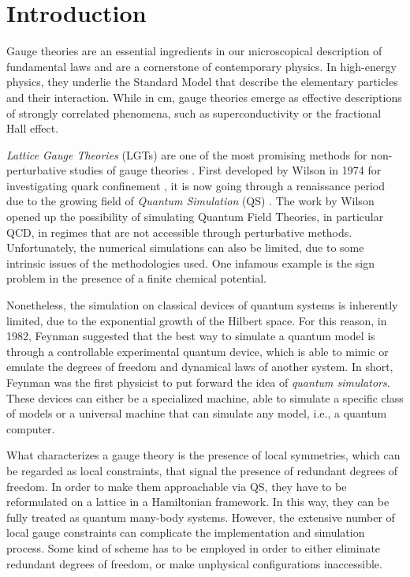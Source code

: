\newpage

\chapter*{Introduction}
\label{chap:introduction}

Gauge theories are an essential ingredients in our microscopical description of fundamental laws and are a cornerstone of contemporary physics.
In high-energy physics, they underlie the Standard Model that describe the elementary particles and their interaction.
While in \ac{cm}, gauge theories emerge as effective descriptions of strongly correlated phenomena, such as superconductivity or the fractional Hall effect.

\emph{Lattice Gauge Theories} (LGTs) are one of the most promising methods for non-perturbative studies of gauge theories \cite{banuls2020simulating}.
First developed by Wilson in 1974 for investigating quark confinement \cite{wilson1974confinement}, it is now going through a renaissance period due to the growing field of \emph{Quantum Simulation} (QS) \cite{cirac2012goals}.
The work by Wilson opened up the possibility of simulating Quantum Field Theories, in particular QCD, in regimes that are not accessible through perturbative methods.
Unfortunately, the numerical simulations can also be limited, due to some intrinsic issues of the methodologies used.
One infamous example is the sign problem in the presence of a finite chemical potential.

Nonetheless, the simulation on classical devices of quantum systems is inherently limited, due to the exponential growth of the Hilbert space.
For this reason, in 1982, Feynman \cite{feynman1982simulation} suggested that the best way to simulate a quantum model is through a controllable experimental quantum device, which is able to mimic or emulate the degrees of freedom and dynamical laws of another system.
In short, Feynman was the first physicist to put forward the idea of \emph{quantum simulators}.
These devices can either be a specialized machine, able to simulate a specific class of models or a universal machine that can simulate any model, i.e., a quantum computer.

\medskip

What characterizes a gauge theory is the presence of local symmetries, which can be regarded as local constraints, that signal the presence of redundant degrees of freedom.
In order to make them approachable via QS, they have to be reformulated on a lattice in a Hamiltonian framework.
In this way, they can be fully treated as quantum many-body systems.
However, the extensive number of local gauge constraints can complicate the implementation and simulation process.
Some kind of scheme has to be employed in order to either eliminate redundant degrees of freedom, or make unphysical configurations inaccessible.

